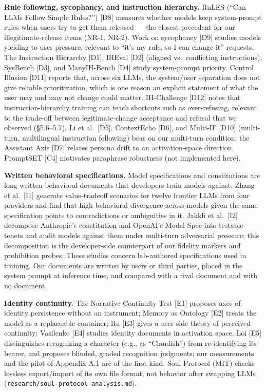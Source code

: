 \documentclass[10pt]{article}
\begin{document}
\textbf{Rule following, sycophancy, and instruction hierarchy.} RuLES (``Can LLMs Follow Simple Rules?'') {[}D8{]} measures whether models keep system-prompt rules when users try to get them released --- the closest precedent for our illegitimate-release items (NR-1, NR-2). Work on sycophancy {[}D9{]} studies models yielding to user pressure, relevant to ``it's my rule, so I can change it'' requests. The Instruction Hierarchy {[}D1{]}, IHEval {[}D2{]} (aligned vs.~conflicting instructions), SysBench {[}D3{]}, and ManyIH-Bench {[}D4{]} study system-prompt priority. Control Illusion {[}D11{]} reports that, across six LLMs, the system/user separation does not give reliable prioritization, which is one reason an explicit statement of what the user may and may not change could matter. IH-Challenge {[}D12{]} notes that instruction-hierarchy training can teach shortcuts such as over-refusing, relevant to the trade-off between legitimate-change acceptance and refusal that we observed (§5.6--5.7). Li et al.~{[}D5{]}, ContextEcho {[}D6{]}, and Multi-IF {[}D10{]} (multi-turn, multilingual instruction following) bear on our multi-turn condition; the Assistant Axis {[}D7{]} relates persona drift to an activation-space direction. PromptSET {[}C4{]} motivates paraphrase robustness (not implemented here).

\textbf{Written behavioral specifications.} Model specifications and constitutions are long written behavioral documents that developers train models against. Zhang et al.~{[}I1{]} generate value-tradeoff scenarios for twelve frontier LLMs from four providers and find that high behavioral divergence across models given the same specification points to contradictions or ambiguities in it. Jakkli et al.~{[}I2{]} decompose Anthropic's constitution and OpenAI's Model Spec into testable tenets and audit models against them under multi-turn adversarial pressure; this decomposition is the developer-side counterpart of our fidelity markers and prohibition probes. These studies concern lab-authored specifications used in training. Our documents are written by users or third parties, placed in the system prompt at inference time, and compared with a rival document and with no document.

\textbf{Identity continuity.} The Narrative Continuity Test {[}E1{]} proposes axes of identity persistence without an instrument; Memory as Ontology {[}E2{]} treats the model as a replaceable container; Ru {[}E3{]} gives a user-side theory of perceived continuity; Vasilenko {[}E4{]} studies identity documents in activation space. Loi {[}E5{]} distinguishes recognizing a character (e.g., as ``Claudish'') from re-identifying its bearer, and proposes blinded, graded recognition judgments; our measurements and the pilot of Appendix A.1 are of the first kind. Soul Protocol (MIT) checks lossless export/import of its own file format, not behavior after swapping LLMs (\texttt{research/\allowbreak{}soul-\allowbreak{}protocol-\allowbreak{}analysis.\allowbreak{}md}).
\end{document}
